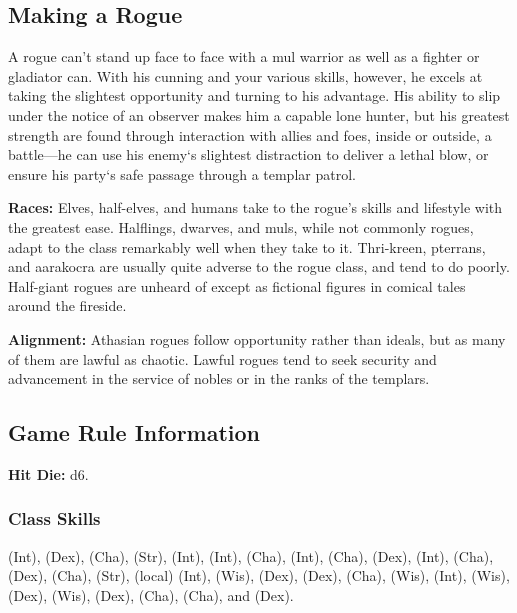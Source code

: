 \subsection{Making a Rogue}

A rogue can't stand up face to face with a mul warrior as well as a fighter or gladiator can. With his cunning and your various skills, however, he excels at taking the slightest opportunity and turning to his advantage. His ability to slip under the notice of an observer makes him a capable lone hunter, but his greatest strength are found through interaction with allies and foes, inside or outside, a battle---he can use his enemy`s slightest distraction to deliver a lethal blow, or ensure his party`s safe passage through a templar patrol.

\textbf{Races:} Elves, half-elves, and humans take to the rogue's skills and lifestyle with the greatest ease. Halflings, dwarves, and muls, while not commonly rogues, adapt to the class remarkably well when they take to it. Thri-kreen, pterrans, and aarakocra are usually quite adverse to the rogue class, and tend to do poorly. Half-giant rogues are unheard of except as fictional figures in comical tales around the fireside.

\textbf{Alignment:} Athasian rogues follow opportunity rather than ideals, but as many of them are lawful as chaotic. Lawful rogues tend to seek security and advancement in the service of nobles or in the ranks of the templars.

\subsection{Game Rule Information}
\textbf{Hit Die:} d6.

\subsubsection{Class Skills}
 (Int),  (Dex),  (Cha),  (Str),  (Int),  (Int),  (Cha),  (Int),  (Cha),  (Dex),  (Int),  (Cha),  (Dex),  (Cha),  (Str),  (local) (Int),  (Wis),  (Dex),  (Dex),  (Cha),  (Wis),  (Int),  (Wis),  (Dex),  (Wis),  (Dex),  (Cha),  (Cha), and  (Dex).

